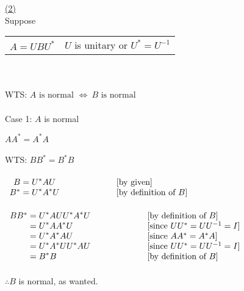 \documentclass[12pt]{article}
\newenvironment{proofindent}{\vspace*{1mm}\hfill\begin{minipage}{\dimexpr\textwidth-10mm}}{\end{minipage}}
\begin{document}
\hyperlink{toc}{\hypertarget{1.2}{(2)}}\\
Suppose\\
\begin{tabularx}{\textwidth}{>{\centering\arraybackslash}X  >{\centering\arraybackslash}X}
	$A = UBU^*$ & $U$ is unitary or $U^* = U^{-1}$
\end{tabularx}\\\\
WTS: $A \text{ is normal } \iff \ B \text{ is normal}$\\\\
Case 1: $A$ is normal

\begin{proofindent}
	$AA^* = A^*A$
	\\\\
	WTS: $BB^* = B^*B$
	\\\\
	{$\begin{array}{r@{}>{\displaystyle}ll}
			B   & {}= U^*AU                  & [\text{by given}]\vspace*{0mm} \\
			B^* & {}= U^*A^*U \hspace*{20mm} & [\text{by definition of } B]   \\
		\end{array}$}
	\\\\
	{$\begin{array}{r@{}>{\displaystyle}ll}
			BB^* & {}= U^*AU U^*A^*U  \hspace*{20mm} & [\text{by definition of } B]       \\
			     & {}= U^*AA^*U                      & [\text{since } UU^* = UU^{-1} = I] \\
			     & {}= U^*A^*AU                      & [\text{since } AA^* = A^*A]        \\
			     & {}= U^*A^* UU^* AU                & [\text{since } UU^* = UU^{-1} = I] \\
			     & {}= B^*B                          & [\text{by definition of } B]       \\
		\end{array}$}\\\\
	$\therefore B$ is normal, as wanted.\\
\end{proofindent}\\\\
\end{document}
